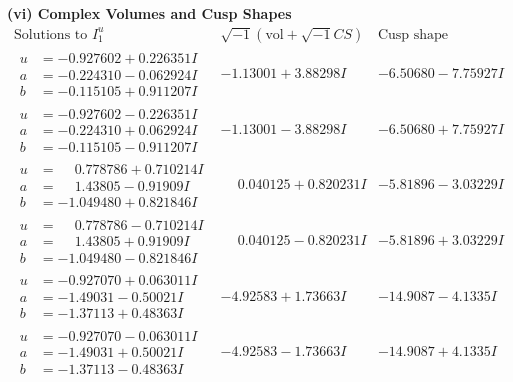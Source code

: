 \documentclass[1p]{elsarticle_modified}
\theoremstyle{definition}
\newcommand{\I}{\sqrt{-1}}
\begin{document}
\newpage\flushleft \textbf{(vi) Complex Volumes and Cusp Shapes}
$$\begin{array}{c|c|c}  
\text{Solutions to }I^u_{1}& \I (\text{vol} + \sqrt{-1}CS) & \text{Cusp shape}\\
 \hline 
\begin{aligned}
u &= -0.927602 + 0.226351 I \\
a &= -0.224310 - 0.062924 I \\
b &= -0.115105 + 0.911207 I\end{aligned}
 & -1.13001 + 3.88298 I & -6.50680 - 7.75927 I \\ \hline\begin{aligned}
u &= -0.927602 - 0.226351 I \\
a &= -0.224310 + 0.062924 I \\
b &= -0.115105 - 0.911207 I\end{aligned}
 & -1.13001 - 3.88298 I & -6.50680 + 7.75927 I \\ \hline\begin{aligned}
u &= \phantom{-}0.778786 + 0.710214 I \\
a &= \phantom{-}1.43805 - 0.91909 I \\
b &= -1.049480 + 0.821846 I\end{aligned}
 & \phantom{-}0.040125 + 0.820231 I & -5.81896 - 3.03229 I \\ \hline\begin{aligned}
u &= \phantom{-}0.778786 - 0.710214 I \\
a &= \phantom{-}1.43805 + 0.91909 I \\
b &= -1.049480 - 0.821846 I\end{aligned}
 & \phantom{-}0.040125 - 0.820231 I & -5.81896 + 3.03229 I \\ \hline\begin{aligned}
u &= -0.927070 + 0.063011 I \\
a &= -1.49031 - 0.50021 I \\
b &= -1.37113 + 0.48363 I\end{aligned}
 & -4.92583 + 1.73663 I & -14.9087 - 4.1335 I \\ \hline\begin{aligned}
u &= -0.927070 - 0.063011 I \\
a &= -1.49031 + 0.50021 I \\
b &= -1.37113 - 0.48363 I\end{aligned}
 & -4.92583 - 1.73663 I & -14.9087 + 4.1335 I \\ \hline\begin{aligned}

\end{aligned}
\end{array}$$
\end{document}

